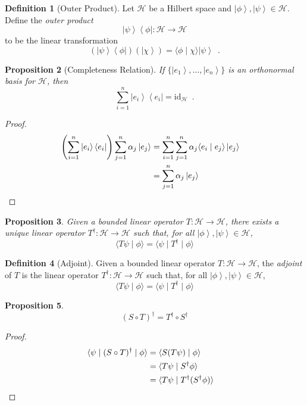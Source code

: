 \documentclass{book}
\let\qed\relax
\newtheorem{prop}{Proposition}[chapter]
\theoremstyle{definition}
\newtheorem{df}[prop]{Definition}
\newcommand{\bra}[1]{\ensuremath{\left\langle {#1} \right|}}
\newcommand{\id}[1]{\ensuremath{\mathrm{id}_{#1}}}
\newcommand{\ket}[1]{\ensuremath{\left| {#1} \right\rangle}}
\begin{document}
\begin{df}[Outer Product]
Let $\mathcal{H}$ be a Hilbert space and $\ket{\phi}, \ket{\psi} \in \mathcal{H}$. Define the \emph{outer product}
\[ \ket{\psi} \bra{\phi} : \mathcal{H} \rightarrow \mathcal{H} \]
to be the linear transformation
\[ (\ket{\psi} \bra{\phi})(\ket{\chi}) = \langle \phi \mid \chi \rangle \ket{\psi} \enspace . \]
\end{df}

\begin{prop}[Completeness Relation]
If $\{ \ket{e_1}, \ldots, \ket{e_n} \}$ is an orthonormal basis for $\mathcal{H}$, then
\[ \sum_{i=1}^n \ket{e_i} \bra{e_i} = \id{\mathcal{H}} \enspace . \]
\end{prop}

\begin{proof}
\pf
\begin{align*}
\left( \sum_{i=1}^n \ket{e_i} \bra{e_i} \right) \sum_{j=1}^n \alpha_j \ket{e_j}
& = \sum_{i=1}^n \sum_{j=1}^n \alpha_j \langle e_i \mid e_j \rangle \ket{e_j} \\
& = \sum_{j=1}^n \alpha_j \ket{e_j} & \qed
\end{align*}
\end{proof}

\begin{prop}
Given a bounded linear operator $T : \mathcal{H} \rightarrow \mathcal{H}$, there exists a unique linear operator $T^\dagger : \mathcal{H} \rightarrow \mathcal{H}$ such that, for all $\ket{\phi}, \ket{\psi} \in \mathcal{H}$,
\[ \langle T \psi \mid \phi \rangle = \langle \psi \mid T^\dagger \mid \phi \rangle \]
\end{prop}


\begin{df}[Adjoint]
Given a bounded linear operator $T : \mathcal{H} \rightarrow \mathcal{H}$, the \emph{adjoint} of $T$ is the linear operator $T^\dagger : \mathcal{H} \rightarrow \mathcal{H}$ such that, for all $\ket{\phi}, \ket{\psi} \in \mathcal{H}$,
\[ \langle T \psi \mid \phi \rangle = \langle \psi \mid T^\dagger \mid \phi \rangle \]
\end{df}

\begin{prop}
\[ (S \circ T)^\dagger = T^\dagger \circ S^\dagger \]
\end{prop}

\begin{proof}
\pf
\begin{align*}
\langle \psi \mid (S \circ T)^\dagger \mid \phi \rangle
& = \langle S(T\psi) \mid \phi \rangle \\
& = \langle T \psi \mid S^\dagger \phi \rangle \\
& = \langle T \psi \mid T^\dagger (S^\dagger \phi) \rangle & \qed
\end{align*}
\end{proof}
\end{document}
